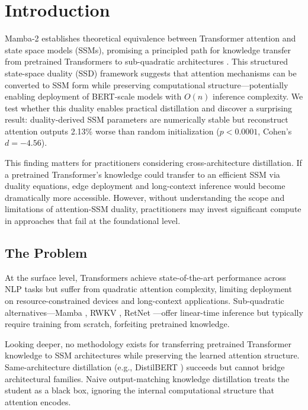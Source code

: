 \section{Introduction}
\label{sec:introduction}

Mamba-2 establishes theoretical equivalence between Transformer attention and state space models (SSMs), promising a principled path for knowledge transfer from pretrained Transformers to sub-quadratic architectures \cite{dao2024mamba2}. This structured state-space duality (SSD) framework suggests that attention mechanisms can be converted to SSM form while preserving computational structure---potentially enabling deployment of BERT-scale models with $O(n)$ inference complexity. We test whether this duality enables practical distillation and discover a surprising result: duality-derived SSM parameters are numerically stable but reconstruct attention outputs 2.13\% worse than random initialization ($p < 0.0001$, Cohen's $d = -4.56$).

This finding matters for practitioners considering cross-architecture distillation. If a pretrained Transformer's knowledge could transfer to an efficient SSM via duality equations, edge deployment and long-context inference would become dramatically more accessible. However, without understanding the scope and limitations of attention-SSM duality, practitioners may invest significant compute in approaches that fail at the foundational level.

\subsection{The Problem}

At the surface level, Transformers achieve state-of-the-art performance across NLP tasks but suffer from quadratic attention complexity, limiting deployment on resource-constrained devices and long-context applications. Sub-quadratic alternatives---Mamba \cite{gu2023mamba}, RWKV \cite{peng2023rwkv}, RetNet \cite{sun2023retnet}---offer linear-time inference but typically require training from scratch, forfeiting pretrained knowledge.

Looking deeper, no methodology exists for transferring pretrained Transformer knowledge to SSM architectures while preserving the learned attention structure. Same-architecture distillation (e.g., DistilBERT \cite{sanh2019distilbert}) succeeds but cannot bridge architectural families. Naive output-matching knowledge distillation treats the student as a black box, ignoring the internal computational structure that attention encodes.


